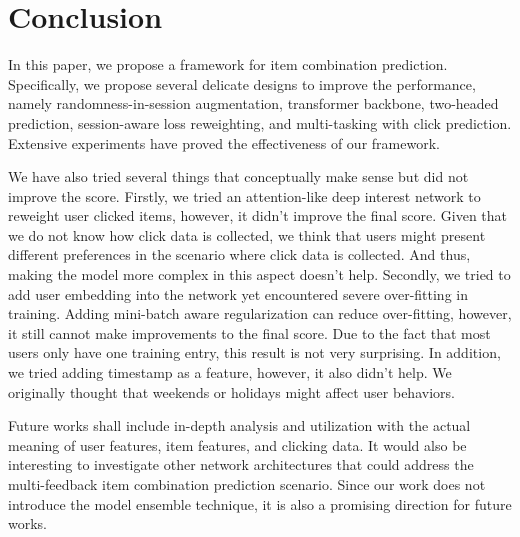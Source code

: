 \section{Conclusion} \label{sec:conclusion}


In this paper, we propose a framework for item combination prediction. Specifically, we propose several delicate designs to improve the performance, namely randomness-in-session augmentation, transformer backbone, two-headed prediction, session-aware loss reweighting, and multi-tasking with click prediction.
Extensive experiments have proved the effectiveness of our framework.

We have also tried several things that conceptually make sense but did not improve the score.
Firstly, we tried an attention-like deep interest network \cite{din} to reweight user clicked items, however, it didn't improve the final score.
Given that we do not know how click data is collected, we think that users might present different preferences in the scenario where click data is collected. And thus, making the model more complex in this aspect doesn't help.
Secondly, we tried to add user embedding into the network yet encountered severe over-fitting in training. Adding mini-batch aware regularization \cite{din} can reduce over-fitting, however, it still cannot make improvements to the final score.
Due to the fact that most users only have one training entry, this result is not very surprising.
In addition, we tried adding timestamp as a feature, however, it also didn't help. We originally thought that weekends or holidays might affect user behaviors.



Future works shall include in-depth analysis and utilization with the actual meaning of user features, item features, and clicking data. It would also be interesting to investigate other network architectures that could address the multi-feedback item combination prediction scenario.
Since our work does not introduce the model ensemble technique, it is also a promising direction for future works.
